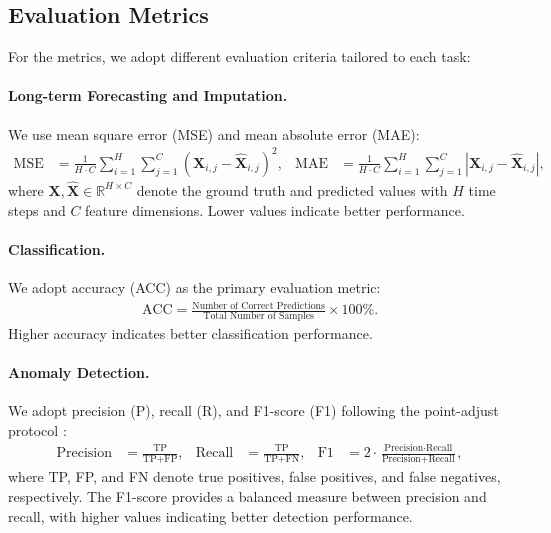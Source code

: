 \subsection{Evaluation Metrics}

For the metrics, we adopt different evaluation criteria tailored to each task:

\paragraph{Long-term Forecasting and Imputation.} We use mean square error (MSE) and mean absolute error (MAE):
\begin{align*}
    \text{MSE} &= \frac{1}{H \cdot C} \sum_{i=1}^H \sum_{j=1}^C (\mathbf{X}_{i,j} - \widehat{\mathbf{X}}_{i,j})^2, &
    \text{MAE} &= \frac{1}{H \cdot C} \sum_{i=1}^H \sum_{j=1}^C |\mathbf{X}_{i,j} - \widehat{\mathbf{X}}_{i,j}|,
\end{align*}
where $\mathbf{X},\widehat{\mathbf{X}}\in\mathbb{R}^{H\times C}$ denote the ground truth and predicted values with $H$ time steps and $C$ feature dimensions. Lower values indicate better performance.


\paragraph{Classification.} We adopt accuracy (ACC) as the primary evaluation metric:
\begin{align*}
    \text{ACC} = \frac{\text{Number of Correct Predictions}}{\text{Total Number of Samples}} \times 100\%.
\end{align*}
Higher accuracy indicates better classification performance.


\paragraph{Anomaly Detection.} We adopt precision (P), recall (R), and F1-score (F1) following the point-adjust protocol \citep{xu2021anomaly}:
\begin{align*}
    \text{Precision} &= \frac{\text{TP}}{\text{TP} + \text{FP}}, &
    \text{Recall} &= \frac{\text{TP}}{\text{TP} + \text{FN}}, &
    \text{F1} &= 2 \cdot \frac{\text{Precision} \cdot \text{Recall}}{\text{Precision} + \text{Recall}},
\end{align*}
where TP, FP, and FN denote true positives, false positives, and false negatives, respectively. The F1-score provides a balanced measure between precision and recall, with higher values indicating better detection performance.

